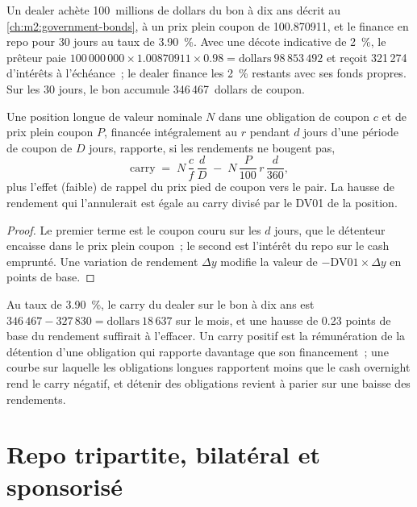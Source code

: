 \begin{example}\label{ex:m2:repo-and-specials:finance}
Un dealer achète 100~millions de dollars du bon à dix ans décrit au
\cref{ch:m2:government-bonds}, à un prix plein coupon de 100.870911, et le finance
en repo pour 30 jours au taux de 3.90~\%. Avec une décote indicative de 2~\%, le prêteur
paie $100\,000\,000 \times 1.00870911 \times 0.98 = \text{dollars}~98\,853\,492$ et
reçoit 321\,274 d'intérêts à l'échéance~; le dealer finance les 2~\% restants
avec ses fonds propres. Sur les 30 jours, le bon accumule 346\,467~dollars de coupon.
\end{example}

\begin{proposition}\label{prop:m2:repo-and-specials:carry}
Une position longue de valeur nominale $N$ dans une obligation de coupon $c$ et de prix plein coupon $P$,
financée intégralement au  $r$ pendant $d$ jours d'une période de coupon de $D$
jours, rapporte, si les rendements ne bougent pas,
\[
\text{carry} \;=\; N\,\frac{c}{f}\,\frac{d}{D} \;-\; N\,\frac{P}{100}\,r\,\frac{d}{360},
\]
plus l'effet (faible) de rappel du prix pied de coupon vers le pair. La hausse de rendement qui
l'annulerait est égale au carry divisé par le DV01 de la position.
\end{proposition}
\begin{proof}
Le premier terme est le coupon couru sur les $d$ jours, que le détenteur
encaisse dans le prix plein coupon~; le second est l'intérêt du repo sur le cash
emprunté. Une variation de rendement $\Delta y$ modifie la valeur de $-\mathrm{DV01}\times
\Delta y$ en points de base.
\end{proof}

Au taux de 3.90~\%, le carry du dealer sur le bon à dix ans est $346\,467 - 327\,830 =
\text{dollars}~18\,637$ sur le mois, et une hausse de 0.23 points de base du rendement suffirait à
l'effacer. Un carry positif est la rémunération de la détention d'une obligation qui rapporte
davantage que son financement~; une courbe sur laquelle les obligations longues rapportent moins que le
cash overnight rend le carry négatif, et détenir des obligations revient à parier sur une baisse des rendements.

\section{Repo tripartite, bilatéral et sponsorisé}

